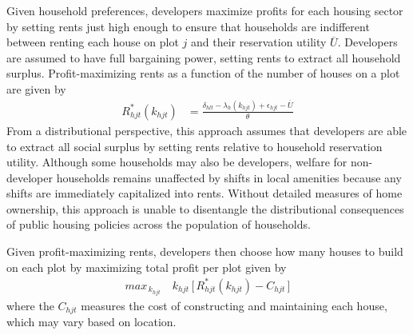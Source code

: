 \documentclass[12pt]{article}
\begin{document}
Given household preferences, developers maximize profits for each housing sector by setting rents just high enough to ensure that households are indifferent between renting each house on plot $j$ and their reservation utility $\overline{U}$.  Developers are assumed to have full bargaining power, setting rents to extract all household surplus.  Profit-maximizing rents as a function of the number of houses on a plot are given by
\begin{align}
R_{hjt}^{*}(k_{hjt}) &= \frac{ \delta_{hlt} - \lambda_{h}(k_{hjt}) + \epsilon_{hjt} - \overline{U}}{\theta}
\end{align}
From a distributional perspective, this approach assumes that developers are able to extract all social surplus by setting rents relative to household reservation utility.  Although some households may also be developers, welfare for non-developer households remains unaffected by shifts in local amenities because any shifts are immediately capitalized into rents.  Without detailed measures of home ownership, this approach is unable to disentangle the distributional consequences of public housing policies across the population of households.

Given profit-maximizing rents, developers then choose how many houses to build on each plot by maximizing total profit per plot given by
\begin{align*}
max_{\,k_{hjt}} \,\,\,\,\,\,  k_{hjt} \, \Big[ \, R_{hjt}^{*}(k_{hjt}) - C_{hjt} \, \Big ]
\end{align*}
\noindent where the $C_{hjt}$ measures the cost of constructing and maintaining each house, which may vary based on location.

\end{document}
